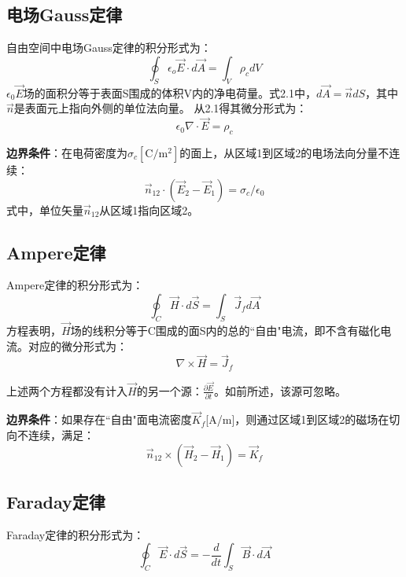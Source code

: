 \subsection{电场Gauss定律}
自由空间中电场Gauss定律的积分形式为：
\begin{equation}
\oint_S \epsilon_o\vec{E}\cdot d\vec{A}=\int_V\rho_c dV
\end{equation}
$\epsilon_0\vec{E}$场的面积分等于表面S围成的体积V内的净电荷量。式2.1中，$d\vec{A} =\vec{n}dS$，其中$\vec{n}$是表面元上指向外侧的单位法向量。
从2.1得其微分形式为：
\begin{equation}
  \epsilon_0 \nabla \cdot \vec{E}=\rho_c
\end{equation}

\textbf{边界条件}：在电荷密度为$\sigma_c[\mathrm{C/m^2}]$的面上，从区域1到区域2的电场法向分量不连续：
\begin{equation}
  \vec{n}_{12}\cdot (\vec{E}_2-\vec{E}_1)=\sigma_c/\epsilon_0
\end{equation}
式中，单位矢量$\vec{n}_{12}$从区域1指向区域2。

\subsection{Ampere定律}
Ampere定律的积分形式为：
\begin{equation}
\oint_C \vec{H}\cdot d\vec{S}=\int_S \vec{J}_f d\vec{A}
\end{equation}
方程表明，$\vec{H}$场的线积分等于C围成的面S内的总的``自由"电流，即不含有磁化电流。对应的微分形式为：
\begin{equation}
   \nabla \times \vec{H}=\vec{J}_f
\end{equation}

上述两个方程都没有计入$\vec{H}$的另一个源：$\frac{\partial{\vec{E}}}{\partial{t}}$。如前所述，该源可忽略。

\textbf{边界条件}：如果存在``自由"面电流密度$\vec{K}_f$[A/m]，则通过区域1到区域2的磁场在切向不连续，满足：
\begin{equation}
  \vec{n}_{12}\times (\vec{H}_2-\vec{H}_1)=\vec{K}_f
\end{equation}

\subsection{Faraday定律}
Faraday定律的积分形式为：
\begin{equation}\label{eqn:faradaylaw}
\oint_C \vec{E}\cdot d\vec{S}=-\frac{d}{dt}\int_S \vec{B}\cdot d\vec{A}
\end{equation}

